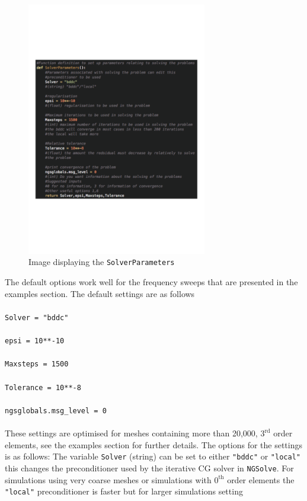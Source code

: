\begin{figure}[H]
\begin{center}
\includegraphics[width=0.7\textwidth]{Figures/SolverParameters}
\caption{Image displaying the \texttt{SolverParameters}}\label{fig:SolverParameters.py}
\end{center}
\end{figure}
\noindent
The default options work well for the frequency sweeps that are presented in the examples section. The default settings are as follows\\
\\
\texttt{Solver = "bddc"}\\
\\
\texttt{epsi = 10**-10}\\
\\
\texttt{Maxsteps = 1500}\\
\\
\texttt{Tolerance = 10**-8}\\
\\
\texttt{ngsglobals.msg\_level = 0}\\
\\
These settings are optimised for meshes containing more than 20,000, $3^{\textrm{rd}}$ order elements, see the examples section for further details. The options for the settings is as follows: The variable \texttt{Solver} (string) can be set to either \texttt{"bddc"} or \texttt{"local"} this changes the preconditioner used by the iterative CG solver in \texttt{NGSolve}. For simulations using very coarse meshes or simulations with $0^{\textrm{th}}$ order elements the \texttt{"local"} preconditioner is faster but for larger simulations setting\\
